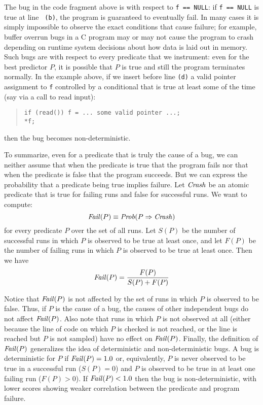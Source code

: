 The bug in the code fragment above is  with
respect to {\tt f == NULL}: if {\tt f == NULL} is true at line {\tt
(b)}, the program is guaranteed to eventually fail.  In many cases it
is simply impossible to observe the exact conditions that cause
failure; for example, buffer overrun bugs in a C program may or may
not cause the program to crash depending on runtime system decisions
about how data is laid out in memory.  Such bugs are
 with respect to every predicate that we instrument:
even for the best predictor $P$, it is possible that $P$ is true and
still the program terminates normally.  In the example above, if we insert before line
{\tt (d)} a valid pointer  assignment to {\tt f} controlled by a conditional that is true
at least some of the time (say via a call to read input):
\begin{quote}
\begin{verbatim}
if (read()) f = ... some valid pointer ...;
*f;
\end{verbatim}
\end{quote}
then the bug becomes non-deterministic.

To summarize, even for a predicate that is truly the cause of a bug, we can neither assume that
when the predicate is true that
the program fails nor that when the predicate is false that
the program succeeds. But we can express the probability that a predicate
being true implies failure.  Let $\mbox{\textit{Crash}}$ be an atomic predicate that is
true for failing runs and false for successful runs.  We want to compute:
\[ \mbox{\textit{Fail}}(P) \equiv \mbox{\textit{Prob}}(P \Rightarrow \mbox{\textit{Crash}}) \]
for every predicate $P$ over the set of all runs.  Let $S(P)$ be the number
of successful runs in which $P$ is observed to be true at least once, and let $F(P)$ be the number of
failing runs in which $P$ is observed to be true at least once.  Then we have
\[ \mbox{\textit{Fail}}(P) = \frac{F(P)}{S(P) + F(P)} \]

Notice that $\mbox{\textit{Fail}}(P)$ is not affected by the set of runs in which
$P$ is observed to be false.  Thus, if $P$ is the cause of a bug, the
causes of other independent bugs do not affect $\mbox{\textit{Fail}}(P)$.
Also note that runs in which $P$ is not observed at all (either because
the line of code on which $P$ is checked is not reached, or the line is reached
but $P$ is not sampled) have no effect on $\mbox{\textit{Fail}}(P)$.
Finally, the definition of $\mbox{\textit{Fail}}(P)$
generalizes the idea of deterministic and non-deterministic bugs.  A
bug is deterministic for $P$ if $\mbox{\textit{Fail}}(P) = 1.0$ or, equivalently,
$P$ is never observed to be true in a successful run ($S(P) =
0$) and $P$ is observed to be true in at least one failing run ($F(P) > 0$).
If $\mbox{\textit{Fail}}(P) < 1.0$ then the bug is non-deterministic, with
lower scores showing weaker correlation between the predicate and
program failure.

